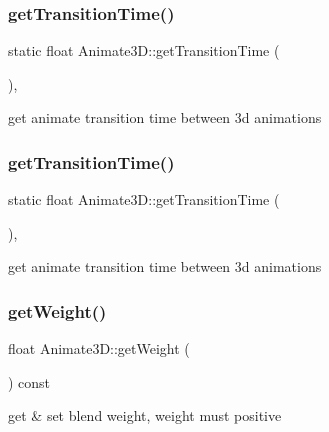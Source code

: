 \subsubsection{\texorpdfstring{get\+Transition\+Time()}{getTransitionTime()}\hspace{0.1cm}{\footnotesize\ttfamily [1/2]}}
{\footnotesize\ttfamily static float Animate3\+D\+::get\+Transition\+Time (\begin{DoxyParamCaption}{ }\end{DoxyParamCaption})\hspace{0.3cm}{\ttfamily [inline]}, {\ttfamily [static]}}

get animate transition time between 3d animations \mbox{\label{classAnimate3D_a50adc250e0012bd6fffc86763854360b}} 
\subsubsection{\texorpdfstring{get\+Transition\+Time()}{getTransitionTime()}\hspace{0.1cm}{\footnotesize\ttfamily [2/2]}}
{\footnotesize\ttfamily static float Animate3\+D\+::get\+Transition\+Time (\begin{DoxyParamCaption}{ }\end{DoxyParamCaption})\hspace{0.3cm}{\ttfamily [inline]}, {\ttfamily [static]}}

get animate transition time between 3d animations \mbox{\label{classAnimate3D_ac221fedd9e89cf60aa2a9ba6b7fabea8}} 
\subsubsection{\texorpdfstring{get\+Weight()}{getWeight()}\hspace{0.1cm}{\footnotesize\ttfamily [1/2]}}
{\footnotesize\ttfamily float Animate3\+D\+::get\+Weight (\begin{DoxyParamCaption}{ }\end{DoxyParamCaption}) const\hspace{0.3cm}{\ttfamily [inline]}}

get \& set blend weight, weight must positive \mbox{\label{classAnimate3D_ac221fedd9e89cf60aa2a9ba6b7fabea8}} 
